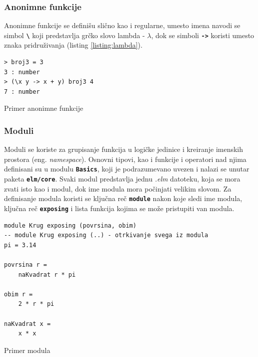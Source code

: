 \documentclass[12pt,oneside]{memoir}
\begin{document}
\subsubsection{Anonimne funkcije}
Anonimne funkcije se definišu slično kao i regularne, umesto imena navodi se simbol 
\texttt{\textbf{\textbackslash}} koji predstavlja grčko slovo lambda - \(\lambda\),
dok se simboli \texttt{\textbf{->}} koristi umesto znaka pridruživanja (listing \ref{listing:lambda}).
\begin{listing}[h]
\begin{verbatim}
> broj3 = 3
3 : number
> (\x y -> x + y) broj3 4
7 : number
\end{verbatim}
\caption{Primer anonimne funkcije}
\label{listing:lambda}
\end{listing}

\subsubsection{Moduli}
Moduli se koriste za grupisanje funkcija u logičke jedinice i kreiranje imenskih 
prostora (eng. \emph{namespace}). Osnovni tipovi, kao i funkcije i operatori nad njima 
definisani su u modulu \texttt{\textbf{Basics}}, koji je podrazumevano uvezen i nalazi se 
unutar paketa \texttt{\textbf{elm/core}}. Svaki modul predstavlja jednu \emph{.elm} datoteku,
koja se mora zvati isto kao i modul, dok ime modula mora počinjati velikim slovom.
Za definisanje modula koristi se ključna reč \texttt{\textbf{module}} nakon koje sledi
ime modula, ključna reč \texttt{\textbf{exposing}} i lista funkcija kojima se može 
pristupiti van modula.
\begin{listing}[h]
\begin{verbatim}
module Krug exposing (povrsina, obim) 
-- module Krug exposing (..) - otrkivanje svega iz modula 
pi = 3.14

povrsina r =
    naKvadrat r * pi

obim r =
    2 * r * pi

naKvadrat x =
    x * x
\end{verbatim}
\caption{Primer modula}
\label{listing:modul}
\end{listing}
\end{document}
